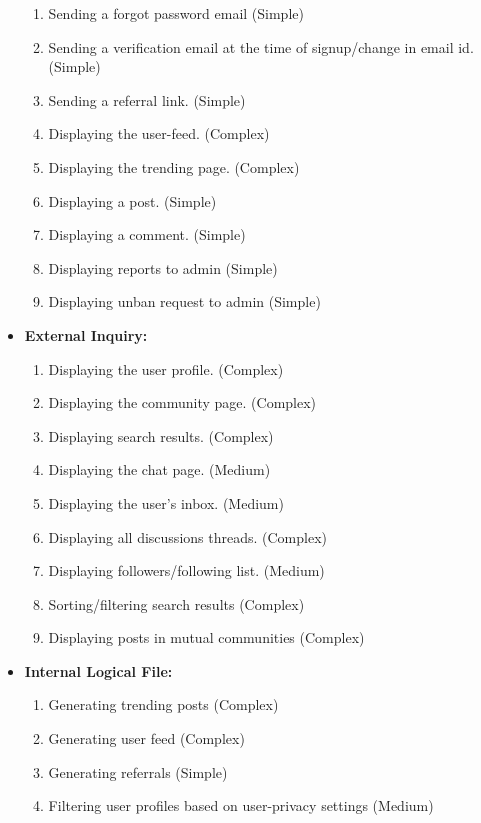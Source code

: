 \documentclass[11pt]{article}
\begin{document}
\begin{itemize}
\begin{enumerate}
              \item Sending a forgot password email (Simple)
              \item Sending a verification email at the time of signup/change in email id. (Simple)
              \item Sending a referral link. (Simple)
              \item Displaying the user-feed. (Complex)
              \item Displaying the trending page. (Complex)
              \item Displaying a post. (Simple)
              \item Displaying a comment. (Simple)
              \item Displaying reports to admin (Simple)
              \item Displaying unban request to admin (Simple)
          \end{enumerate}
    \item \textbf{External Inquiry:}
          \begin{enumerate}
              \item Displaying the user profile. (Complex)
              \item Displaying the community page. (Complex)
              \item Displaying search results. (Complex)
              \item Displaying the chat page. (Medium)
              \item Displaying the user's inbox. (Medium)
              \item Displaying all discussions threads. (Complex)
              \item Displaying followers/following list. (Medium)
              \item Sorting/filtering search results (Complex)
              \item Displaying posts in mutual communities (Complex)
          \end{enumerate}
    \item \textbf{Internal Logical File:}
          \begin{enumerate}
              \item Generating trending posts (Complex)
              \item Generating user feed (Complex)
              \item Generating referrals (Simple)
              \item Filtering user profiles based on user-privacy settings (Medium)

\end{enumerate}
\end{itemize}
\end{document}
